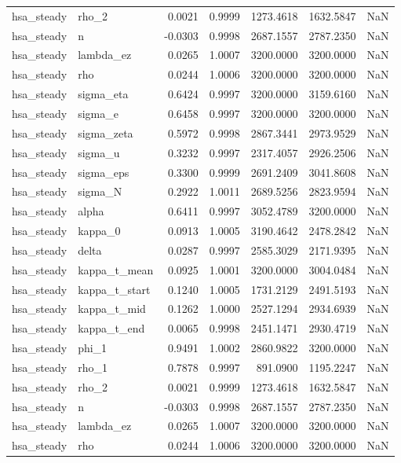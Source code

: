 \begin{tabular}{llrrrrl}
hsa\_steady & rho\_2 & 0.0021 & 0.9999 & 1273.4618 & 1632.5847 & NaN \\
hsa\_steady & n & -0.0303 & 0.9998 & 2687.1557 & 2787.2350 & NaN \\
hsa\_steady & lambda\_ez & 0.0265 & 1.0007 & 3200.0000 & 3200.0000 & NaN \\
hsa\_steady & rho & 0.0244 & 1.0006 & 3200.0000 & 3200.0000 & NaN \\
hsa\_steady & sigma\_eta & 0.6424 & 0.9997 & 3200.0000 & 3159.6160 & NaN \\
hsa\_steady & sigma\_e & 0.6458 & 0.9997 & 3200.0000 & 3200.0000 & NaN \\
hsa\_steady & sigma\_zeta & 0.5972 & 0.9998 & 2867.3441 & 2973.9529 & NaN \\
hsa\_steady & sigma\_u & 0.3232 & 0.9997 & 2317.4057 & 2926.2506 & NaN \\
hsa\_steady & sigma\_eps & 0.3300 & 0.9999 & 2691.2409 & 3041.8608 & NaN \\
hsa\_steady & sigma\_N & 0.2922 & 1.0011 & 2689.5256 & 2823.9594 & NaN \\
hsa\_steady & alpha & 0.6411 & 0.9997 & 3052.4789 & 3200.0000 & NaN \\
hsa\_steady & kappa\_0 & 0.0913 & 1.0005 & 3190.4642 & 2478.2842 & NaN \\
hsa\_steady & delta & 0.0287 & 0.9997 & 2585.3029 & 2171.9395 & NaN \\
hsa\_steady & kappa\_t\_mean & 0.0925 & 1.0001 & 3200.0000 & 3004.0484 & NaN \\
hsa\_steady & kappa\_t\_start & 0.1240 & 1.0005 & 1731.2129 & 2491.5193 & NaN \\
hsa\_steady & kappa\_t\_mid & 0.1262 & 1.0000 & 2527.1294 & 2934.6939 & NaN \\
hsa\_steady & kappa\_t\_end & 0.0065 & 0.9998 & 2451.1471 & 2930.4719 & NaN \\
hsa\_steady & phi\_1 & 0.9491 & 1.0002 & 2860.9822 & 3200.0000 & NaN \\
hsa\_steady & rho\_1 & 0.7878 & 0.9997 & 891.0900 & 1195.2247 & NaN \\
hsa\_steady & rho\_2 & 0.0021 & 0.9999 & 1273.4618 & 1632.5847 & NaN \\
hsa\_steady & n & -0.0303 & 0.9998 & 2687.1557 & 2787.2350 & NaN \\
hsa\_steady & lambda\_ez & 0.0265 & 1.0007 & 3200.0000 & 3200.0000 & NaN \\
hsa\_steady & rho & 0.0244 & 1.0006 & 3200.0000 & 3200.0000 & NaN \\

\end{tabular}
